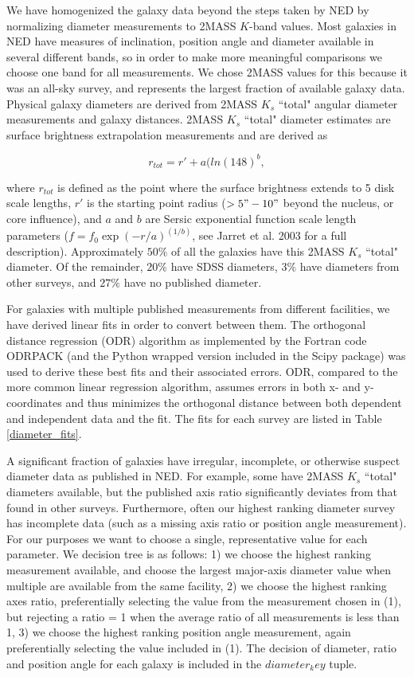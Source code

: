 \documentclass[iop]{emulateapj-rtx4}
\begin{document}
We have homogenized the galaxy data beyond the steps taken by NED by normalizing diameter measurements to 2MASS $K$-band values. Most galaxies in NED have measures of inclination, position angle and diameter available in several different bands, so in order to make more meaningful comparisons we choose one band for all measurements. We chose 2MASS values for this because it was an all-sky survey, and represents the largest fraction of available galaxy data. Physical galaxy diameters are derived from 2MASS $K_s$ ``total" angular diameter measurements and galaxy distances. 2MASS $K_s$ ``total" diameter estimates are surface brightness extrapolation measurements and are derived as 

\begin{equation}
r_{tot} = r' + a(ln(148)^b,
\end{equation}

\noindent where $r_{tot}$ is defined as the point where the surface brightness extends to 5 disk scale lengths, $r'$ is the starting point radius ($>5" - 10"$ beyond the nucleus, or core influence), and $a$ and $b$ are Sersic exponential function scale length parameters ($f = f_0 \exp{(-r/a)}^{(1/b)}$, see Jarret et al. 2003 for a full description). Approximately $50\%$ of all the galaxies have this 2MASS $K_s$ ``total" diameter. Of the remainder, $20\%$ have SDSS diameters, $3\%$ have diameters from other surveys, and $27\%$ have no published diameter. 

For galaxies with multiple published measurements from different facilities, we have derived linear fits in order to convert between them. The orthogonal distance regression (ODR) algorithm as implemented by the Fortran code ODRPACK (and the Python wrapped version included in the Scipy package) was used to derive these best fits and their associated errors. ODR, compared to the more common linear regression algorithm, assumes errors in both x- and y-coordinates and thus minimizes the orthogonal distance between both dependent and independent data and the fit. The fits for each survey are listed in Table \ref{diameter_fits}.

A significant fraction of galaxies have irregular, incomplete, or otherwise suspect diameter data as published in NED. For example, some have 2MASS $K_s$ ``total" diameters available, but the published axis ratio significantly deviates from that found in other surveys. Furthermore, often our highest ranking diameter survey has incomplete data (such as a missing axis ratio or position angle measurement). For our purposes we want to choose a single, representative value for each parameter. We decision tree is as follows: 1) we choose the highest ranking measurement available, and choose the largest major-axis diameter value when multiple are available from the same facility, 2) we choose the highest ranking axes ratio, preferentially selecting the value from the measurement chosen in (1), but rejecting a ratio = 1 when the average ratio of all measurements is less than 1, 3) we choose the highest ranking position angle measurement, again preferentially selecting the value included in (1). The decision of diameter, ratio and position angle for each galaxy is included in the $diameter_key$ tuple.
\end{document}
